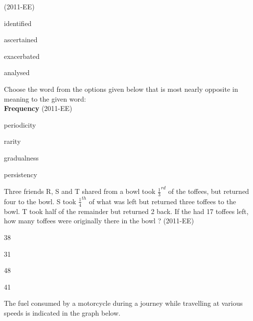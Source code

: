 \hfill(2011-EE)
\begin{enumerate}
    \begin{multicols}{2}
    \item identified
    \item ascertained
    \item exacerbated
    \item analysed
    \end{multicols}
\end{enumerate}
\item Choose the word from the options given below that is most nearly opposite in meaning to the given word: \\
\textbf{Frequency} \hfill(2011-EE)
\begin{enumerate}
    \begin{multicols}{2}
        \item periodicity
        \item rarity
        \item gradualness
        \item persistency
    \end{multicols}
\end{enumerate}
\item Three friends R, S and T shared from a bowl took $\frac{1}{3}^{rd}$ of the toffees, but returned four to the bowl. S took $\frac{1}{4}^{th}$ of what was left but returned three toffees to the bowl. T took half of the remainder but returned 2 back. If the had 17 toffees left, how many toffees were originally there in the bowl ? \hfill(2011-EE)
	\begin{enumerate}
	\end{enumerate}
\item The fuel consumed by a motorcycle during a journey while travelling at various speeds is indicated in the graph below.
